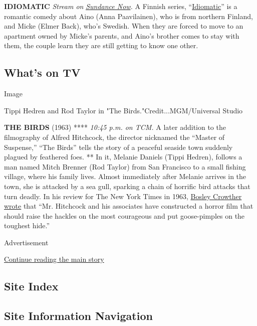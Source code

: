 \textbf{IDIOMATIC} \emph{Stream on}
\href{https://www.sundancenow.com/series/watch/idiomatic/26360242b9115b0b?season=1}{\emph{Sundance
Now}}\emph{.} A Finnish series,
``\href{https://thesavvyscreener.com/2020/03/02/finnish-laughs-thrills/}{Idiomatic}''
is a romantic comedy about Aino (Anna Paavilainen), who is from northern
Finland, and Micke (Elmer Back), who's Swedish. When they are forced to
move to an apartment owned by Micke's parents, and Aino's brother comes
to stay with them, the couple learn they are still getting to know one
other.

\hypertarget{whats-on-tv}{%
\subsection{What's on TV}\label{whats-on-tv}}

Image

Tippi Hedren and Rod Taylor in "The Birds."Credit...MGM/Universal Studio

\textbf{THE BIRDS} (1963) **** \emph{10:45 p.m. on TCM.} A later
addition to the filmography of Alfred Hitchcock, the director nicknamed
the ``Master of Suspense,'' ``The Birds'' tells the story of a peaceful
seaside town suddenly plagued by feathered foes. ** In it, Melanie
Daniels (Tippi Hedren), follows a man named Mitch Brenner (Rod Taylor)
from San Francisco to a small fishing village, where his family lives.
Almost immediately after Melanie arrives in the town, she is attacked by
a sea gull, sparking a chain of horrific bird attacks that turn deadly.
In his review for The New York Times in 1963,
\href{https://www.nytimes.com/1963/04/01/archives/screen-the-birdshitchcocks-feathered-fiends-are-chilling.html}{Bosley
Crowther wrote} that ``Mr. Hitchcock and his associates have constructed
a horror film that should raise the hackles on the most courageous and
put goose-pimples on the toughest hide.''

Advertisement

\protect\hyperlink{after-bottom}{Continue reading the main story}

\hypertarget{site-index}{%
\subsection{Site Index}\label{site-index}}

\hypertarget{site-information-navigation}{%
\subsection{Site Information
Navigation}\label{site-information-navigation}}

